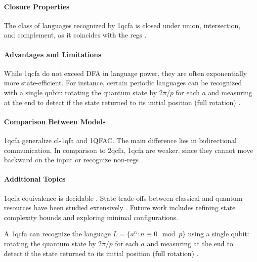 \paragraph{Closure Properties}  
The class of languages recognized by \gls{1qcfa} is closed under union, intersection, and complement, as it coincides with the \glspl{reg} \cite{li2015hybrid}.

\paragraph{Advantages and Limitations}  
While \gls{1qcfa} do not exceed DFA in language power, they are often exponentially more state-efficient. For instance, certain periodic languages can be recognized with a single qubit: rotating the quantum state by $2\pi/p$ for each $a$ and measuring at the end to detect if the state returned to its initial position (full rotation) \cite{xiao2021state, bianchi2014size}.

\paragraph{Comparison Between Models}  
\gls{1qcfa} generalize \gls{cl-1qfa} and 1QFAC. The main difference lies in bidirectional communication. In comparison to \gls{2qcfa}, \gls{1qcfa} are weaker, since they cannot move backward on the input or recognize non-\glspl{reg} \cite{li2015hybrid}.

\paragraph{Additional Topics}  
\gls{1qcfa} equivalence is decidable \cite{li2015hybrid}. State trade-offs between classical and quantum resources have been studied extensively \cite{qiu2009equivalence, xiao2021state}. Future work includes refining state complexity bounds and exploring minimal configurations.

\begin{example}  
A \gls{1qcfa} can recognize the language $L = \{ a^n : n \equiv 0 \mod p \}$ using a single qubit: rotating the quantum state by $2\pi/p$ for each $a$ and measuring at the end to detect if the state returned to its initial position (full rotation) \cite{bianchi2014power}.
\end{example}

\subsubsection{}

